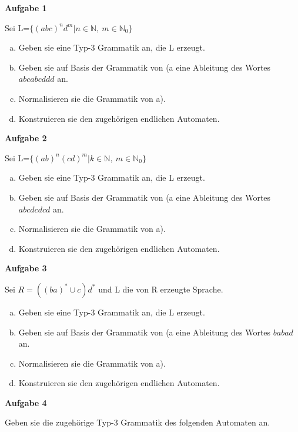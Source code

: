 \documentclass[a4paper,12pt]{article}
\newcommand{\Aufgabe}[1]{
  {
  \vspace*{0.5cm}
  \textsf{\textbf{Aufgabe #1}}
  \vspace*{0.2cm}
  
  }
}
\begin{document}
\Aufgabe{1}
Sei L=$\{(abc)^n d^m \vert n \in \mathbb{N}, \ m\in \mathbb{N}_0 \}$
\begin{enumerate}[a)]
\item Geben sie eine Typ-3 Grammatik an, die L erzeugt.
\item Geben sie auf Basis der Grammatik von (a eine Ableitung des Wortes $abcabcddd$ an.
\item Normalisieren sie die Grammatik von a).
\item Konstruieren sie den zugehörigen endlichen Automaten.
\end{enumerate}

\Aufgabe{2}
Sei L=$\{(ab)^n(cd)^m \vert k \in \mathbb{N}, \ m\in \mathbb{N}_0 \}$
\begin{enumerate}[a)]
\item Geben sie eine Typ-3 Grammatik an, die L erzeugt.
\item Geben sie auf Basis der Grammatik von (a eine Ableitung des Wortes $abcdcdcd$ an.
\item Normalisieren sie die Grammatik von a).
\item Konstruieren sie den zugehörigen endlichen Automaten.
\end{enumerate}

\Aufgabe{3}
Sei $R = ((ba)^* \cup c ) d^* $
und L die von R erzeugte Sprache.
\begin{enumerate}[a)]
\item Geben sie eine Typ-3 Grammatik an, die L erzeugt.
\item Geben sie auf Basis der Grammatik von (a eine Ableitung des Wortes $babad$ an.
\item Normalisieren sie die Grammatik von a).
\item Konstruieren sie den zugehörigen endlichen Automaten.
\end{enumerate}


\Aufgabe{4}
Geben sie die zugehörige Typ-3 Grammatik des folgenden Automaten an.



\\
\end{document}
